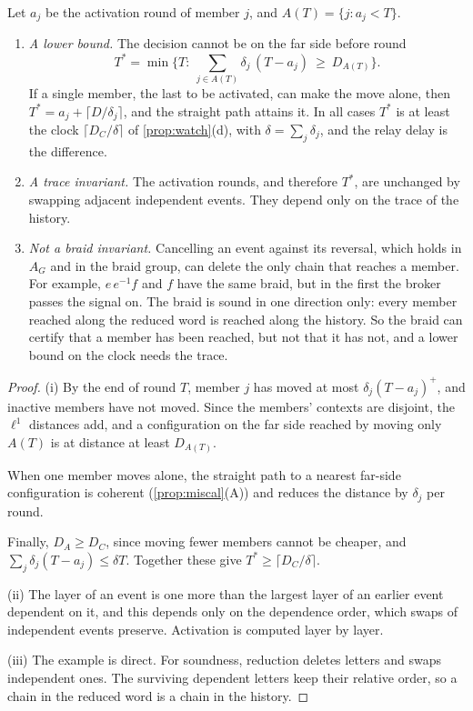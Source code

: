 \documentclass[11pt]{article}
\theoremstyle{definition}\newtheorem{definition}[theorem]{Definition}\newtheorem{remark}[theorem]{Remark}\newtheorem{example}[theorem]{Example}\newtheorem{problem}[theorem]{Open problem}\crefname{problem}{Problem}{Problems}
\begin{document}
\begin{proposition}\label{prop:relay}
Let $a_j$ be the activation round of member $j$, and $A(T)=\{j:a_j<T\}$.
\begin{enumerate}
\item[(i)] \emph{A lower bound.} The decision cannot be on the far side before round
\[
T^\ast=\min\Big\{T:\ \sum_{j\in A(T)}\delta_j\,(T-a_j)\ \ge\ D_{A(T)}\Big\}.
\]
If a single member, the last to be activated, can make the move alone, then $T^\ast=a_j+\lceil D/\delta_j\rceil$, and the straight path attains it. In all cases $T^\ast$ is at least the clock $\lceil D_C/\delta\rceil$ of \cref{prop:watch}(d), with $\delta=\sum_j\delta_j$, and the relay delay is the difference.
\item[(ii)] \emph{A trace invariant.} The activation rounds, and therefore $T^\ast$, are unchanged by swapping adjacent independent events. They depend only on the trace of the history.
\item[(iii)] \emph{Not a braid invariant.} Cancelling an event against its reversal, which holds in $A_G$ and in the braid group, can delete the only chain that reaches a member. For example, $e\,e^{-1}f$ and $f$ have the same braid, but in the first the broker passes the signal on. The braid is sound in one direction only: every member reached along the reduced word is reached along the history. So the braid can certify that a member has been reached, but not that it has not, and a lower bound on the clock needs the trace.
\end{enumerate}
\end{proposition}

\begin{proof}
(i) By the end of round $T$, member $j$ has moved at most $\delta_j(T-a_j)^+$, and inactive members have not moved. Since the members' contexts are disjoint, the $\ell^1$ distances add, and a configuration on the far side reached by moving only $A(T)$ is at distance at least $D_{A(T)}$.

When one member moves alone, the straight path to a nearest far-side configuration is coherent (\cref{prop:miscal}(A)) and reduces the distance by $\delta_j$ per round.

Finally, $D_A\ge D_C$, since moving fewer members cannot be cheaper, and $\sum_j\delta_j(T-a_j)\le\delta T$. Together these give $T^\ast\ge\lceil D_C/\delta\rceil$.

(ii) The layer of an event is one more than the largest layer of an earlier event dependent on it, and this depends only on the dependence order, which swaps of independent events preserve. Activation is computed layer by layer.

(iii) The example is direct. For soundness, reduction deletes letters and swaps independent ones. The surviving dependent letters keep their relative order, so a chain in the reduced word is a chain in the history.
\end{proof}
\end{document}
